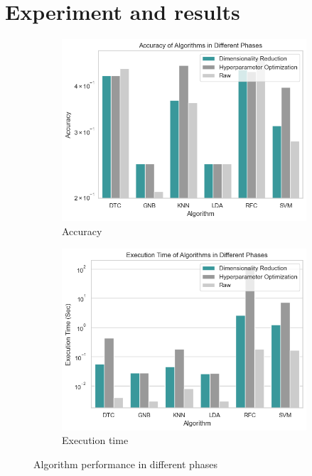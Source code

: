 \documentclass[conference,onecolumn]{IEEEtran}
\begin{document}
\section{Experiment and results}
    
\begin{figure}[H]
    \centering
    
    \begin{subfigure}{0.45\textwidth}
        \centering
        \includegraphics[width=\linewidth]{Plots/AccuracyofAlgorithmsinDifferentPhases.png}
        \caption{Accuracy}
        \label{fig:accuracyOfAlgorithmsInDifferentphases}
    \end{subfigure}
    \hfill
    \begin{subfigure}{0.45\textwidth}
        \centering
        \includegraphics[width=\linewidth]{Plots/ExecutionTimeofAlgorithmsinDifferentPhases.png}
        \caption{Execution time}
        \label{fig:executionTimeOfAlgorithmsInDifferentphases}
    \end{subfigure}
    
    \caption{Algorithm performance in different phases}
\end{figure}
\end{document}
